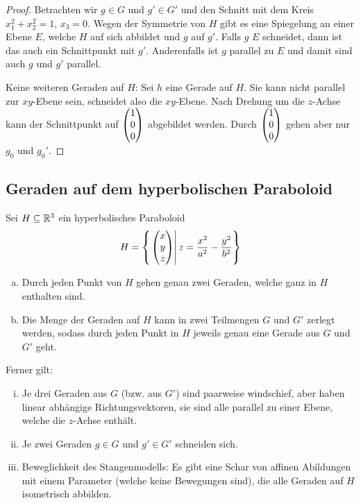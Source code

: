 \documentclass[
 a4paper,
 12pt,
 parskip=half
 ]{scrartcl}
\theoremstyle{plain}
\theoremstyle{definition}
\begin{document}
\begin{proof}
  Betrachten wir $g \in G$ und $g' \in G'$ und den Schnitt mit dem Kreis $x_1^2
  + x_2^2 = 1$, $x_3 = 0$. Wegen der Symmetrie von $H$ gibt es eine Spiegelung
  an einer Ebene $E$, welche $H$ auf sich abbildet und $g$ auf $g'$. Falls $g$
  $E$ schneidet, dann ist das auch ein Schnittpunkt mit $g'$. Anderenfalls ist
  $g$ parallel zu $E$ und damit sind auch $g$ und $g'$ parallel.

  Keine weiteren Geraden auf $H$: Sei $h$ eine Gerade auf $H$. Sie kann nicht
  parallel zur $xy$-Ebene sein, schneidet also die $xy$-Ebene. Nach Drehung um
  die $z$-Achse kann der Schnittpunkt auf $\begin{pmatrix}1\\0\\0\end{pmatrix}$ abgebildet werden.
  Durch $\begin{pmatrix}1\\0\\0\end{pmatrix}$ gehen aber nur $g_0 $ und $g_0'$.
\end{proof}

\clearpage

\subsection{Geraden auf dem hyperbolischen Paraboloid}
\begin{thm}
  Sei $H \subseteq \mathbb{R}^3$ ein hyperbolisches Paraboloid
  \[ H = \left\{ \left. \begin{pmatrix}x\\y\\z\end{pmatrix} \right| z = \frac{x^2}{a^2} -
      \frac{y^2}{b^2} \right\} \]
  \begin{enumerate}[a)]
  \item Durch jeden Punkt von $H$ gehen genau zwei Geraden, welche ganz in $H$
    enthalten sind.
  \item Die Menge der Geraden auf $H$ kann in zwei Teilmengen $G$ und $G'$
    zerlegt werden, sodass durch jeden Punkt in $H$ jeweils genau eine Gerade
    aus $G$ und $G'$ geht.
  \end{enumerate}

  Ferner gilt:
  \begin{enumerate}[i)]
  \item Je drei Geraden aus $G$ (bzw. aus $G'$) sind paarweise windschief, aber
    haben linear abhängige Richtungsvektoren, sie sind alle parallel zu einer
    Ebene, welche die $z$-Achse enthält.
  \item Je zwei Geraden $g \in G$ und $g' \in G'$ schneiden sich.
  \item Beweglichkeit des Stangenmodells: Es gibt eine Schar von affinen
    Abildungen mit einem Parameter (welche keine Bewegungen sind), die alle
    Geraden auf $H$ isometrisch abbilden.
  \end{enumerate}
\end{thm}
\end{document}
